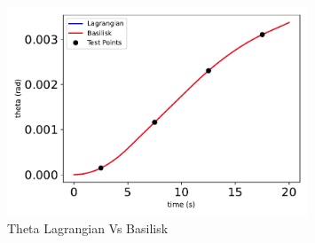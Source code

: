 \begin{figure}[htbp]\centerline{\includegraphics[width=0.8\textwidth]{AutoTeX/ThetaLagrangianVsBasilisk}}\caption{Theta Lagrangian Vs Basilisk}\label{fig:ThetaLagrangianVsBasilisk}\end{figure}